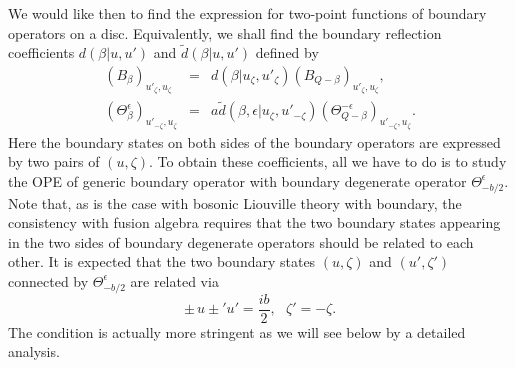\documentclass[a4paper,12pt]{article}
\newcommand{\ep}{{\epsilon}}
\begin{document}
   We would like then to find the expression for two-point
 functions of boundary operators on a disc.
 Equivalently, we shall find the boundary reflection coefficients
 $d(\beta|u,u')$ and $\tilde{d}(\beta|u,u')$ defined by
\begin{eqnarray}
  (B_\beta)_{u'_\zeta,u_\zeta}
 &=& d(\beta|u_\zeta,u'_\zeta)(B_{Q-\beta})_{u'_\zeta,u_\zeta},
\nonumber \\
  (\Theta_\beta^\ep)_{u'_{-\zeta},u_\zeta}
 &=& a\tilde{d}(\beta,\ep|u_\zeta,u'_{-\zeta})
  (\Theta_{Q-\beta}^{-\ep})_{u'_{-\zeta},u_\zeta}.
\end{eqnarray}
 Here the boundary states on both sides of the
 boundary operators are expressed by two pairs of $(u,\zeta)$.
 To obtain these coefficients, all we have to do is to study
 the OPE of generic boundary operator with boundary degenerate
 operator $\Theta_{-b/2}^\ep$.
 Note that, as is the case with bosonic Liouville theory with boundary,
 the consistency with fusion algebra requires that the two
 boundary states appearing in the two sides of boundary
 degenerate operators should be related to each other.
 It is expected that the two boundary states $(u,\zeta)$ and
 $(u',\zeta')$ connected by $\Theta_{-b/2}^\ep$ are related via
\begin{equation}
  \pm\, u\pm'u' = \frac{ib}{2},~~~
  \zeta' = -\zeta.
\end{equation}
 The condition is actually more stringent as we will see
 below by a detailed analysis.
\end{document}
